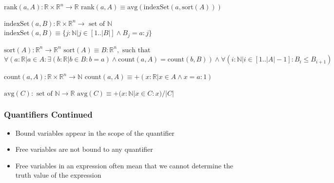 \documentclass[t,12pt,numbers,fleqn]{beamer}
\begin{document}
\begin{frame}

\noindent $\mbox{rank}(a, A): \mathbb{R} \times \mathbb{R}^n \rightarrow \mathbb{R}$\newline
$\mbox{rank}(a, A) \equiv \mbox{avg}(\mbox{indexSet}(a, \mbox{sort}(A)))$\newline

\noindent $\mbox{indexSet}(a, B): \mathbb{R} \times \mathbb{R}^n \rightarrow \mbox{ set of }
\mathbb{N}$\newline
$\mbox{indexSet}(a, B) \equiv \{j: \mathbb{N} | j \in [1..|B|]
\wedge B_j = a : j \}$\newline

\noindent $\mbox{sort}(A): \mathbb{R}^n \rightarrow \mathbb{R}^n$\newline
$\mbox{sort}(A) \equiv B: \mathbb{R}^n, \mbox{ such that }$\newline
$\forall (a: \mathbb{R} | a \in A : \exists(b: \mathbb{R} | b \in B: b = a)
\wedge \mbox{count}(a, A) = \mbox{count}(b, B)) \wedge \forall (i: \mathbb{N} | i \in [1..|A|-1] : B_i \leq B_{i+1})$\newline

\noindent $\mbox{count}(a, A): \mathbb{R} \times \mathbb{R}^n \rightarrow \mathbb{N}$\newline
$\mbox{count}(a, A) \equiv + (x: \mathbb{R} | x \in A \wedge x = a : 1)$\newline

\noindent $\mbox{avg}(C): \mbox{ set of } \mathbb{N} \rightarrow \mathbb{R}$\newline
$\mbox{avg}(C) \equiv + (x: \mathbb{N} | x \in C : x) / |C|$\newline

\end{frame}


\begin{frame}
\frametitle{Quantifiers Continued}
\begin{itemize}
\item Bound variables appear in the scope of the quantifier
\item Free variables are not bound to any quantifier
\item Free variables in an expression often  mean that we cannot determine the truth value of the expression
\end{itemize}
\end{frame}
\end{document}
